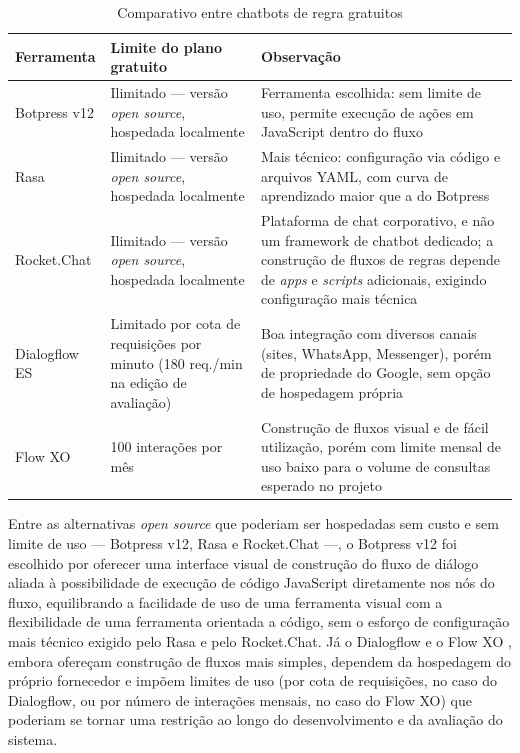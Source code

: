 \begin{table}[H]
  \centering
  \caption{Comparativo entre chatbots de regra gratuitos}
  \label{tab:comparativo-chatbots-regra}
  \begin{tabular}{p{2.0cm}p{4.8cm}p{6.0cm}}
    \hline
    \textbf{Ferramenta} & \textbf{Limite do plano gratuito} & \textbf{Observação} \\
    \hline
    Botpress v12 & Ilimitado --- versão \textit{open source}, hospedada localmente & Ferramenta escolhida: sem limite de uso, permite execução de ações em JavaScript dentro do fluxo \\
    Rasa & Ilimitado --- versão \textit{open source}, hospedada localmente & Mais técnico: configuração via código e arquivos YAML, com curva de aprendizado maior que a do Botpress \\
    Rocket.Chat & Ilimitado --- versão \textit{open source}, hospedada localmente & Plataforma de chat corporativo, e não um framework de chatbot dedicado; a construção de fluxos de regras depende de \textit{apps} e \textit{scripts} adicionais, exigindo configuração mais técnica \\
    Dialogflow ES & Limitado por cota de requisições por minuto (180 req./min na edição de avaliação) & Boa integração com diversos canais (sites, WhatsApp, Messenger), porém de propriedade do Google, sem opção de hospedagem própria \\
    Flow XO & 100 interações por mês & Construção de fluxos visual e de fácil utilização, porém com limite mensal de uso baixo para o volume de consultas esperado no projeto \\
    \hline
  \end{tabular}
\end{table}

Entre as alternativas \textit{open source} que poderiam ser hospedadas sem custo e sem limite de uso --- Botpress v12, Rasa \cite{rasa-docs} e Rocket.Chat \cite{rocketchat-docs} ---, o Botpress v12 foi escolhido por oferecer uma interface visual de construção do fluxo de diálogo aliada à possibilidade de execução de código JavaScript diretamente nos nós do fluxo, equilibrando a facilidade de uso de uma ferramenta visual com a flexibilidade de uma ferramenta orientada a código, sem o esforço de configuração mais técnico exigido pelo Rasa e pelo Rocket.Chat. Já o Dialogflow \cite{dialogflow-quotas} e o Flow XO \cite{flowxo-pricing}, embora ofereçam construção de fluxos mais simples, dependem da hospedagem do próprio fornecedor e impõem limites de uso (por cota de requisições, no caso do Dialogflow, ou por número de interações mensais, no caso do Flow XO) que poderiam se tornar uma restrição ao longo do desenvolvimento e da avaliação do sistema.

